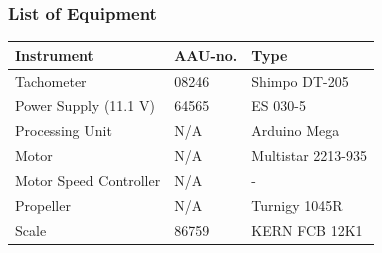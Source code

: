 \subsubsection{List of Equipment}
\begin{table}[H]
    \centering
	\begin{tabular}{|l|l|p{4.3cm}|}
		\hline%
		\textbf{Instrument}                                  &  \textbf{AAU-no.}  &  \textbf{Type}                       \\
		\hline%
		Tachometer                                           &  08246           &  Shimpo DT-205		                   \\
		\hline%
	    Power Supply (11.1 V) &  64565                   &  ES 030-5                 \\
		\hline%
		Processing Unit                                   &  N/A               & Arduino Mega     \\
		\hline%
		Motor                                   &  N/A               & Multistar 2213-935     \\
		\hline%
		Motor Speed Controller                                   &  N/A               &  -      \\
		\hline%
		Propeller                                   &  N/A               & Turnigy 1045R     \\
		\hline%
		Scale                                  &  86759              & KERN FCB 12K1     \\
		\hline%
		
	\end{tabular}
\end{table}

